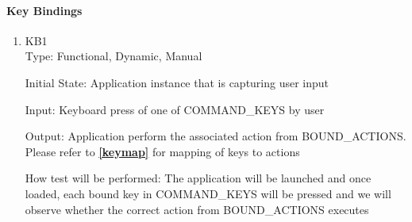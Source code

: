 \documentclass[12pt, titlepage]{article}
\begin{document}
	\paragraph{Key Bindings}
	\begin{enumerate}
		\item{KB1\\}
		Type: Functional, Dynamic, Manual
		
		Initial State: Application instance that is capturing user input
		
		Input: Keyboard press of one of COMMAND\_KEYS by user
		
		Output: Application perform the associated action from BOUND\_ACTIONS. 
		Please refer to \textbf{\autoref{keymap}}  for mapping of keys
		to actions
		
		How test will be performed: The application will be launched and once loaded,
		each bound key in COMMAND\_KEYS will be pressed and we will observe whether
		the correct action from BOUND\_ACTIONS executes
		
	\end{enumerate}
\end{document}
